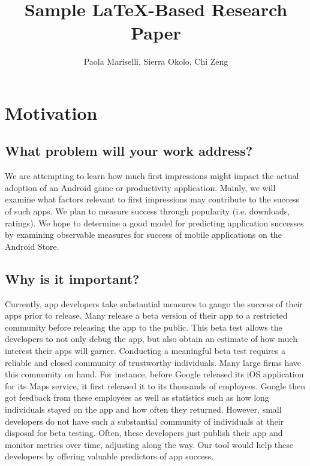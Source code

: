 \documentclass{article}
\title{Sample \LaTeX-Based Research Paper}
\author{Paola Mariselli, Sierra Okolo, Chi Zeng}
\date{}
\begin{document}
\maketitle


\section{Motivation}

\subsection{What problem will your work address?}

We are attempting to learn how much first impressions might impact the actual adoption of an Android game or productivity application. Mainly, we will examine what factors relevant to first impressions may contribute to the success of such apps. We plan to measure success through popularity (i.e. downloads, ratings). We hope to determine a good model for predicting application successes by examining observable measures for success of mobile applications on the Android Store.

\subsection{Why is it important?}

Currently, app developers take substantial measures to gauge the success of their apps prior to release. Many release a beta version of their app to a restricted community before releasing the app to the public. This beta test allows the developers to not only debug the app, but also obtain an estimate of how much interest their apps will garner. Conducting a meaningful beta test requires a reliable and closed community of trustworthy individuals. Many large firms have this community on hand. For instance, before Google released its iOS application for its Maps service, it first released it to its thousands of employees. Google then got feedback from these employees as well as statistics such as how long individuals stayed on the app and how often they returned. However, small developers do not have such a substantial community of individuals at their disposal for beta testing. Often, these developers just publish their app and monitor metrics over time, adjusting along the way. Our tool would help these developers by offering valuable predictors of app success. \\
\end{document}
